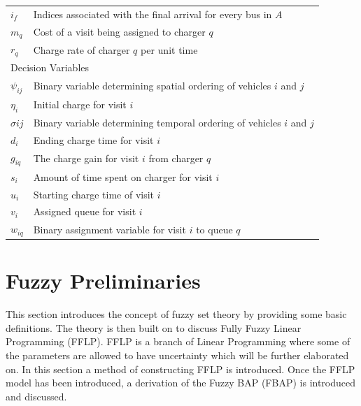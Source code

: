 \documentclass[ee,msthesis]{usuthesis}
\begin{document}
\begin{table}[!htpb]
\begin{tabularx}{\textwidth}{l l}
    $i_f$ & Indices associated with the final arrival for every bus in $A$                                                 \\
    $m_q$ & Cost of a visit being assigned to charger $q$                                                                  \\
    $r_q$ & Charge rate of charger $q$ per unit time                                                                       \\
    \hline
    \multicolumn{2}{l}{Decision Variables}                                                                                 \\
    $\psi_{ij}$ & Binary variable determining spatial ordering of vehicles $i$ and $j$                                       \\
    $\eta_i$    & Initial charge for visit $i$                                                                                \\
    $\sigma{ij}$ & Binary variable determining temporal ordering of vehicles $i$ and $j$                                       \\
    $d_i$    & Ending charge time for visit $i$                                                                            \\
    $g_{iq}$ & The charge gain for visit $i$ from charger $q$                                                              \\
    $s_i$    & Amount of time spent on charger for visit $i$                                                               \\
    $u_i$    & Starting charge time of visit $i$                                                                           \\
    $v_i$    & Assigned queue for visit $i$                                                                                \\
    $w_{iq}$ & Binary assignment variable for visit $i$ to queue $q$                                                       \\
    \bottomrule
  \end{tabularx}
\end{table}


\section{Fuzzy Preliminaries}
\label{sec:fuzzy-preliminaries}
This section introduces the concept of fuzzy set theory by providing some basic definitions. The theory is then built on
to discuss Fully Fuzzy Linear Programming (FFLP). FFLP is a branch of Linear Programming where some of the parameters
are allowed to have uncertainty which will be further elaborated on. In this section a method of constructing FFLP is
introduced. Once the FFLP model has been introduced, a derivation of the Fuzzy BAP (FBAP) is introduced and
discussed.
\end{document}
